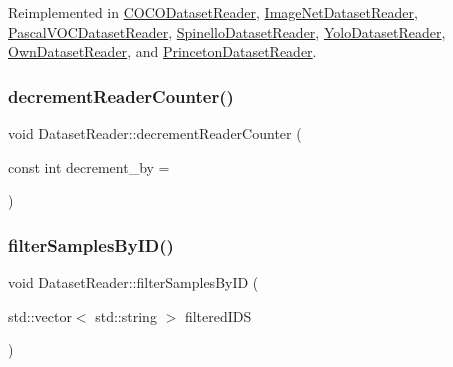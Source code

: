 Reimplemented in \hyperlink{class_c_o_c_o_dataset_reader_a0b7e394c98b512e387952c7f7e39823d}{C\+O\+C\+O\+Dataset\+Reader}, \hyperlink{class_image_net_dataset_reader_ae9aa640c47637de8cf22ed3644c945c6}{Image\+Net\+Dataset\+Reader}, \hyperlink{class_pascal_v_o_c_dataset_reader_a845b70b47078741f29d8e348c3c48467}{Pascal\+V\+O\+C\+Dataset\+Reader}, \hyperlink{class_spinello_dataset_reader_a2313fdf01fb702337dda812f0c341cd9}{Spinello\+Dataset\+Reader}, \hyperlink{class_yolo_dataset_reader_adabb18f657d4e0dc7b03f7f1b77eb452}{Yolo\+Dataset\+Reader}, \hyperlink{class_own_dataset_reader_aaae1790f8ee3efd504fbf17ec717b640}{Own\+Dataset\+Reader}, and \hyperlink{class_princeton_dataset_reader_a078bdc2105cbef10ce0dc8c2fd12923e}{Princeton\+Dataset\+Reader}.

\mbox{\label{class_dataset_reader_ac94f1934639708dc2a29b1ba05e3cc0b}} 
\subsubsection{\texorpdfstring{decrement\+Reader\+Counter()}{decrementReaderCounter()}}
{\footnotesize\ttfamily void Dataset\+Reader\+::decrement\+Reader\+Counter (\begin{DoxyParamCaption}\item[{const int}]{decrement\+\_\+by = {} }\end{DoxyParamCaption})}

\mbox{\label{class_dataset_reader_a17085ffacc392c459a95cd510f341a7d}} 
\subsubsection{\texorpdfstring{filter\+Samples\+By\+I\+D()}{filterSamplesByID()}}
{\footnotesize\ttfamily void Dataset\+Reader\+::filter\+Samples\+By\+ID (\begin{DoxyParamCaption}\item[{std\+::vector$<$ std\+::string $>$}]{filtered\+I\+DS }\end{DoxyParamCaption})}


